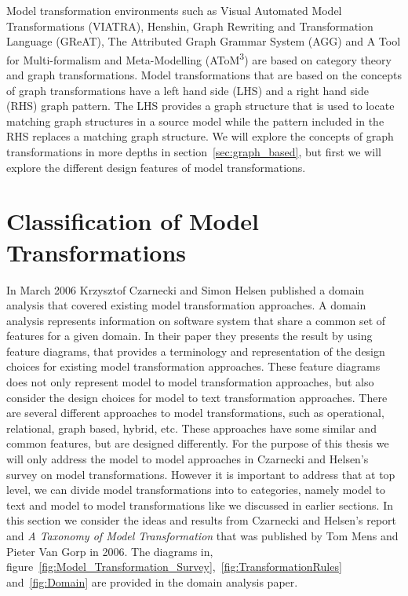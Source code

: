 Model transformation environments such as Visual Automated Model
Transformations\cite{viatra2002} (VIATRA), Henshin\cite{Henshin_2010}, Graph
Rewriting and Transformation Language\cite{great2007} (GReAT), The Attributed
Graph Grammar System\cite{Taentzer2004} (AGG) and A Tool for Multi-formalism and
Meta-Modelling\cite{de2002atom3} (AToM\textsuperscript{3}) are based on category
theory and graph transformations. Model transformations that are based on the
concepts of graph transformations have a left hand side (LHS) and a right hand
side (RHS) graph pattern. The LHS provides a graph structure that is used to
locate matching graph structures in a source model while the pattern included
in the RHS replaces a matching graph structure. We will explore the
concepts of graph transformations in more depths in
section~\ref{sec:graph_based}, but first we will explore the different design
features of model transformations.


\section{Classification of Model Transformations}

In March 2006 Krzysztof Czarnecki and Simon Helsen published a domain analysis
that covered existing model transformation approaches\cite{Czarnecki2006}. A
domain analysis represents information on software system that share a common set of
features for a given domain\cite{FODA,Prieto-Diaz1990}. In their paper they
presents the result by using feature diagrams, that provides a terminology and
representation of the design choices for existing model transformation
approaches. These feature diagrams does not only represent model to model
transformation approaches, but also consider the design choices for model to
text transformation approaches. There are several different approaches to model
transformations, such as operational, relational, graph based, hybrid, etc.
These approaches have some similar and common features, but are designed
differently. For the purpose of this thesis we will only address the model to
model approaches in Czarnecki and Helsen's survey on model transformations.
However it is important to address that at top level, we can divide model
transformations into to categories, namely model to text and model to model
transformations like we discussed in earlier sections.
In this section we consider the ideas and results from Czarnecki and Helsen's
report and \textit{A Taxonomy of Model Transformation}\cite{Mens2006} that was
published by Tom Mens and Pieter Van Gorp in 2006. The diagrams in,
figure~\ref{fig:Model_Transformation_Survey},~\ref{fig:TransformationRules}
and~\ref{fig:Domain} are provided in the domain analysis
paper\cite{Czarnecki2006}.
 
